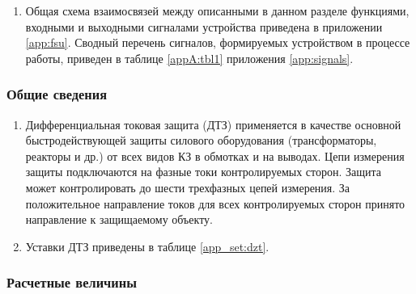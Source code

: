 \documentclass[a4paper, 12pt, table, hidelinks, DIV=calc]{extarticle}
\begin{document}
\begin{enumerate}[label=\arabic{section}.\arabic{subsection}.\arabic*, labelsep=4pt, leftmargin=0pt, itemindent=57pt]
\item
Общая схема взаимосвязей между описанными в данном разделе функциями, входными и выходными сигналами устройства приведена в приложении \ref{app:fsu}.
Сводный перечень сигналов, формируемых устройством в процессе работы, приведен в таблице \ref{appA:tbl1} приложения \ref{app:signals}.

\end{enumerate}
\color{black}

\subsubsection{Общие сведения}

\begin{enumerate}[label=\arabic{section}.\arabic{subsection}.\arabic{subsubsection}.\arabic*,  align=left, labelsep=4pt, leftmargin=0pt, itemindent=57pt]

\item 
Дифференциальная токовая защита (ДТЗ) применяется в качестве основной быстродействующей защиты силового оборудования (трансформаторы, реакторы и др.) от всех видов КЗ в обмотках и на выводах. Цепи измерения защиты подключаются на фазные токи контролируемых сторон. Защита может контролировать до шести трехфазных цепей измерения. За положительное направление токов для всех контролируемых сторон принято направление к защищаемому объекту.

\item 
Уставки ДТЗ приведены в таблице \ref{app_set:dzt}.

\end{enumerate}

\subsubsection{Расчетные величины}
\end{document}
